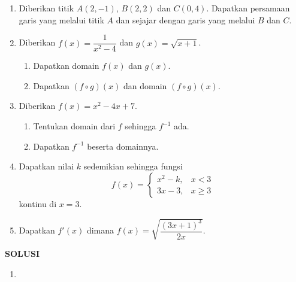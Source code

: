 \documentclass[10pt,openany,a4paper]{article}
\renewcommand{\headrulewidth}{0pt}
\begin{document}
\begin{enumerate}
    \item Diberikan titik $A(2,-1)$, $B(2,2)$ dan $C(0,4)$. Dapatkan persamaan garis yang melalui titik $A$ dan sejajar dengan garis yang melalui $B$ dan $C$.

    \item Diberikan $f(x) = \dfrac{1}{x^2 - 4}$ dan $g(x) = \sqrt{x+1}$.
          \begin{enumerate}
              \item Dapatkan domain $f(x)$ dan $g(x)$.
              \item Dapatkan $(f \circ g)(x)$ dan domain $(f \circ g)(x)$.
          \end{enumerate}

    \item Diberikan $f(x) = x^2 - 4x + 7$.
          \begin{enumerate}
              \item Tentukan domain dari $f$ sehingga $f^{-1}$ ada.
              \item Dapatkan $f^{-1}$ beserta domainnya.
          \end{enumerate}

    \item Dapatkan nilai $k$ sedemikian sehingga fungsi
          \[
              f(x) =
              \begin{cases}
                  x^2 - k, & x < 3    \\
                  3x - 3,  & x \geq 3
              \end{cases}
          \]
          kontinu di $x=3$.

    \item Dapatkan $f'(x)$ dimana
          $
              f(x) = \sqrt{\dfrac{(3x+1)^3}{2x}}.
          $

\end{enumerate}



\newpage
{}
{\centering\textbf{SOLUSI}}
\renewcommand{\arraystretch}{1.5}
\renewcommand{\headrulewidth}{1pt}
\begin{enumerate}
    \item
\end{enumerate}
\end{document}
